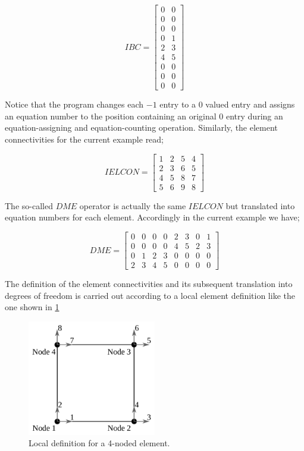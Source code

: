 \[IBC = \left[ {\begin{array}{*{20}{c}}
0&0\\
0&0\\
0&0\\
0&1\\
2&3\\
4&5\\
0&0\\
0&0\\
0&0
\end{array}} \right]\]


Notice that the program changes each $-1$ entry to a $0$ valued entry and assigns an equation number to the position containing an original $0$ entry during an equation-assigning and equation-counting operation. Similarly, the element connectivities for the current example read;

\[IELCON = \left[ {\begin{array}{*{20}{c}}
1&2&5&4\\
2&3&6&5\\
4&5&8&7\\
5&6&9&8
\end{array}} \right]\]

The so-called $DME$ operator is actually the same $IELCON$ but translated into equation numbers for each element. Accordingly in the current example we have;


\[DME = \left[ {\begin{array}{*{20}{c}}
0&0&0&0&2&3&0&1\\
0&0&0&0&4&5&2&3\\
0&1&2&3&0&0&0&0\\
2&3&4&5&0&0&0&0
\end{array}} \right]\]

The definition of the element connectivities and its subsequent translation into degrees of freedom is carried out according to a local element definition like the one shown in \cref{fig:locdof}

\begin{figure}[H]
\centering
\includegraphics[width=0.50\textwidth]{localdof.pdf}
\caption{Local definition for a 4-noded element.}
\label{fig:locdof}
\end{figure}

